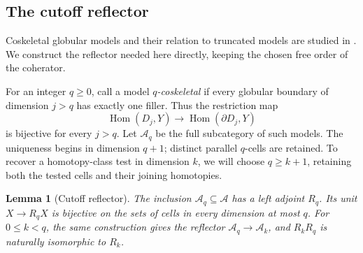 \documentclass[11pt,letterpaper]{article}
\numberwithin{equation}{section}
\theoremstyle{plain}
\newtheorem{lemma}[theorem]{Lemma}
\theoremstyle{definition}
\theoremstyle{remark}
\begin{document}
\subsection{The cutoff reflector}

Coskeletal globular models and their relation to truncated models are
studied in \cite[Section~2]{HenryLanari2023}.  We construct the reflector
needed here directly, keeping the chosen free order of the coherator.

For an integer $q\geq0$, call a model \emph{$q$-coskeletal} if every
globular boundary of dimension $j>q$ has exactly one filler.  Thus the
restriction map
\[
 \operatorname{Hom}(D_j,Y)\longrightarrow\operatorname{Hom}(\partial D_j,Y)
\]
is bijective for every $j>q$.  Let $\mathcal A_q$ be the full subcategory
of such models.  The uniqueness begins in dimension $q+1$; distinct
parallel $q$-cells are retained.
To recover a homotopy-class test in dimension $k$, we will choose
$q\geq k+1$, retaining both the tested cells and their joining homotopies.

\begin{lemma}[Cutoff reflector]\label{lem:cutoff}
The inclusion $\mathcal A_q\subseteq\mathcal A$ has a left adjoint
$R_q$.  Its unit $X\longrightarrow R_qX$ is bijective on the sets of
cells in every dimension at most $q$.  For $0\leq k<q$, the same
construction gives the reflector $\mathcal A_q\to\mathcal A_k$,
and $R_kR_q$ is naturally isomorphic to $R_k$.
\end{lemma}
\end{document}
